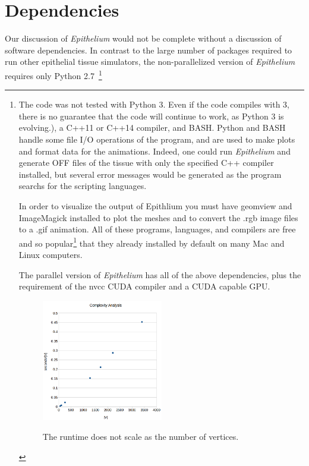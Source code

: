 \section{Dependencies}
Our discussion of \emph{Epithelium} would not be complete without a discussion of software dependencies. In contrast to the large number of packages required to run other epithelial tissue simulators, the non-parallelized version of \emph{Epithelium} requires only Python 2.7~\footnote{The code was not tested with Python 3. Even if the code compiles with 3, there is no guarantee that the code will continue to work, as Python 3 is evolving.), a C++11 or C++14 compiler, and BASH. Python and BASH handle some file I/O operations of the program, and are used to make plots and format data for the animations. Indeed, one could run \emph{Epithelium} and generate OFF files of the tissue with only the specified C++ compiler installed, but several error messages would be generated as the program searchs for the scripting languages.

In order to visualize the output of Epithlium you must have geomview and ImageMagick installed to plot the meshes and to convert the .rgb image files to a .gif animation. All of these programs, languages, and compilers are free and so popular\footnote{Except geomview. Indeed, another program could be used for visualization, but I am most comfortable with this program for quick plotting tasks.} that they already installed by default on many Mac and Linux computers. 

The parallel version of \emph{Epithelium} has all of the above dependencies, plus the requirement of the nvcc CUDA compiler and a CUDA capable GPU. 

\begin{figure}
\centering
\includegraphics[width=0.5\textwidth]{../diagrams/v.png}
\label{fig:v}
\caption{The runtime does not scale as the number of vertices.}
\end{figure}


}
